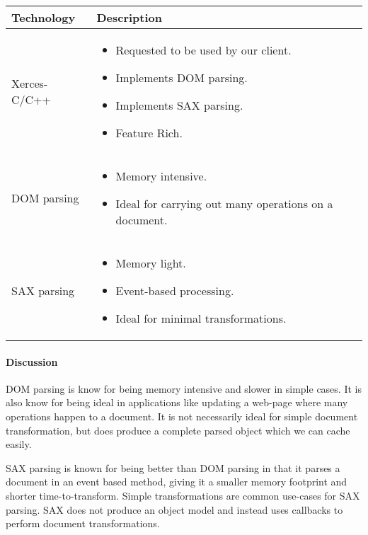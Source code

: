 \begin{center}
  \begin{tabular}{ | l | p{10cm} | }
    \hline
    Technology & Description  \\ \hline

    Xerces-C/C++ \cite{xerces} &
    \begin{itemize}
      \item Requested to be used by our client.
      \item Implements DOM parsing.
      \item Implements SAX parsing.
      \item Feature Rich.
    \end{itemize} \\ \hline

    DOM parsing \cite{dom-vs-sax} &
    \begin{itemize}
      \item Memory intensive.
      \item Ideal for carrying out many operations on a document.
    \end{itemize} \\ \hline

    SAX parsing \cite{dom-vs-sax} &
    \begin{itemize}
      \item Memory light.
      \item Event-based processing.
      \item Ideal for minimal transformations.
    \end{itemize} \\ \hline
  \end{tabular}
\end{center}

\paragraph{Discussion}

DOM parsing is know for being memory intensive and slower in simple cases.
It is also know for being ideal in applications like updating a web-page where many operations happen to a document.
It is not necessarily ideal for simple document transformation, but does produce a complete parsed object which we can cache easily.

SAX parsing is known for being better than DOM parsing in that it parses a document in an event based method, giving it a smaller memory footprint and shorter time-to-transform.
Simple transformations are common use-cases for SAX parsing.
SAX does not produce an object model and instead uses callbacks to perform document transformations.


